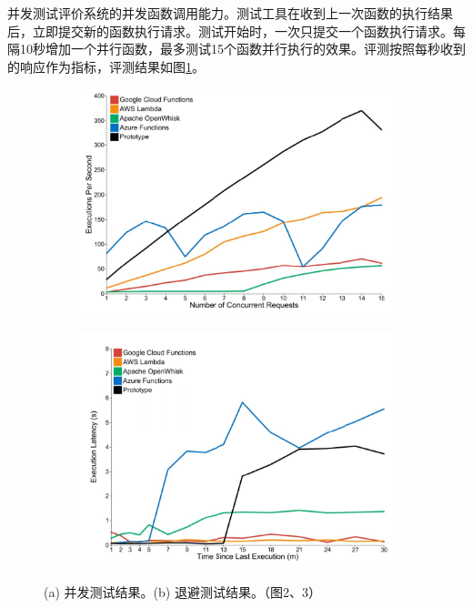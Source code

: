 \documentclass[11pt]{article}
\begin{document}
并发测试评价系统的并发函数调用能力。测试工具在收到上一次函数的执行结果后，立即提交新的函数执行请求。测试开始时，一次只提交一个函数执行请求。每隔10秒增加一个并行函数，最多测试15个函数并行执行的效果。评测按照每秒收到的响应作为指标，评测结果如图\ref{figs:2017_concuttent_test}。
\begin{figure}[!htbp]
	\begin{subfigure}[b]{0.43\linewidth}
		\includegraphics[width=\linewidth]{figs/2017_concuttent_test}
		\caption{}
		\label{figs:2017_concuttent_test}	
	\end{subfigure}
	\begin{subfigure}[b]{0.57\linewidth}
		\includegraphics[width=0.8\linewidth]{figs/2017_backoff_test}
		\caption{}
		\label{figs:2017_backoff_test}
	\end{subfigure}
	\caption{(a) 并发测试结果。(b) 退避测试结果。（\cite{mcgrath2017serverless}图2、3）}
\end{figure}
\end{document}
